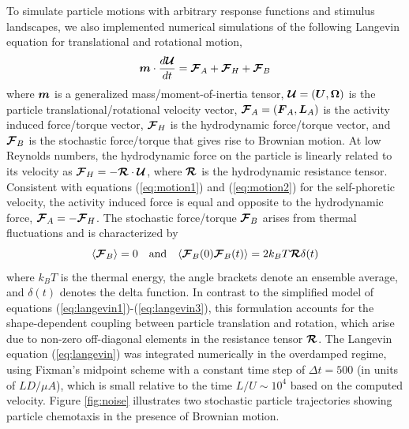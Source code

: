 \begin{appendices}
To simulate particle motions with arbitrary response functions and stimulus landscapes, we also implemented numerical simulations of the following Langevin equation for translational and rotational motion,
\begin{equation}
    \boldsymbol{m}\cdot \frac{d\boldsymbol{\mathcal{U}}}{d t} = \boldsymbol{\mathcal{F}}_A + \boldsymbol{\mathcal{F}}_H + \boldsymbol{\mathcal{F}}_B \label{eq:langevin}
\end{equation}
where $\boldsymbol{m}$ is a generalized mass/moment-of-inertia tensor, $\boldsymbol{\mathcal{U}} = (\boldsymbol{U}, \boldsymbol{\Omega})$ is the particle translational/rotational velocity vector, $\boldsymbol{\mathcal{F}}_A =(\boldsymbol{F}_A, \boldsymbol{L}_A)$ is the activity induced force/torque vector, $\boldsymbol{\mathcal{F}}_H$ is the hydrodynamic force/torque vector, and $\boldsymbol{\mathcal{F}}_B$ is the stochastic force/torque that gives rise to Brownian motion.\autocite{Brady1988a}  At low Reynolds numbers, the hydrodynamic force on the particle is linearly related to its velocity as $\boldsymbol{\mathcal{F}}_H = -\boldsymbol{\mathcal{R}} \cdot\boldsymbol{\mathcal{U}}$, where $\boldsymbol{\mathcal{R}}$ is the hydrodynamic resistance tensor. Consistent with equations (\ref{eq:motion1}) and (\ref{eq:motion2}) for the self-phoretic velocity, the activity induced force is equal and opposite to the hydrodynamic force, $\boldsymbol{\mathcal{F}}_A = -\boldsymbol{\mathcal{F}}_H$. The stochastic force/torque $\boldsymbol{\mathcal{F}}_B$ arises from thermal fluctuations and is characterized by
\begin{equation}
    \langle \boldsymbol{\mathcal{F}}_B \rangle =0 \quad  \text{and} \quad \langle \boldsymbol{\mathcal{F}}_B(0)\boldsymbol{\mathcal{F}}_B(t)\rangle = 2 k_B T \boldsymbol{\mathcal{R}} \delta(t)
\end{equation}
where $k_B T$ is the thermal energy, the angle brackets denote an ensemble average, and $\delta(t)$ denotes the delta function.  In contrast to the simplified model of equations (\ref{eq:langevin1})-(\ref{eq:langevin3}), this formulation accounts for the shape-dependent coupling between particle translation and rotation, which arise due to non-zero off-diagonal elements in the resistance tensor $\boldsymbol{\mathcal{R}}$. The Langevin equation (\ref{eq:langevin}) was integrated numerically in the overdamped regime, using Fixman’s midpoint scheme with a constant time step of $\Delta t = 500$ (in units of $L D/\mu A$), which is small relative to the time $L/U\sim 10^4$ based on the computed velocity.\autocite{delmotte2015simulating,Delong2015}  Figure \ref{fig:noise} illustrates two stochastic particle trajectories showing particle chemotaxis in the presence of Brownian motion.


\end{appendices}
